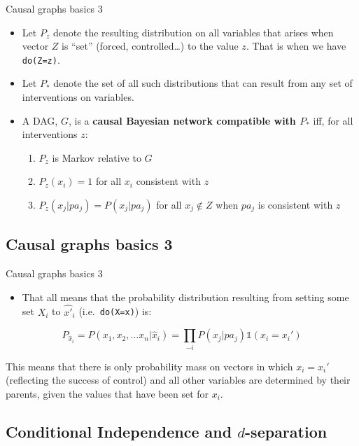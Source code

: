 \documentclass[
  11pt,
  ignorenonframetext,
]{beamer}
\providecommand{\tightlist}{%
  \setlength{\itemsep}{0pt}\setlength{\parskip}{0pt}}\usepackage{longtable,booktabs,array}
\begin{document}
\begin{frame}[fragile]{Causal graphs basics 3}
\begin{itemize}
\item
  Let \(P_{z}\) denote the resulting distribution on all variables that
  arises when vector \(Z\) is ``set'' (forced, controlled\dots) to the
  value \(z\). That is when we have \texttt{do(Z=z)}.
\item
  Let \(P_*\) denote the set of all such distributions that can result
  from any set of interventions on variables.
\item
  A DAG, \(G\), is a \textbf{causal Bayesian network compatible with
  \(P_*\)} iff, for all interventions \(z\):

  \begin{enumerate}
  \tightlist
  \item
    \(P_{z}\) is Markov relative to \(G\)
  \item
    \(P_z(x_i)=1\) for all \(x_i\) consistent with \(z\)
  \item
    \(P_z(x_j|pa_j)=P(x_j|pa_j)\) for all \(x_j \not\in Z\) when
    \(pa_j\) is consistent with \(z\)
  \end{enumerate}
\end{itemize}
\end{frame}

\hypertarget{causal-graphs-basics-3-3}{%
\subsection{Causal graphs basics 3}\label{causal-graphs-basics-3-3}}

\begin{frame}[fragile]{Causal graphs basics 3}
\begin{itemize}
\tightlist
\item
  That all means that the probability distribution resulting from
  setting some set \(X_i\) to \(\hat{x'}_i\)
  (i.e.~\texttt{do(X=x\textquotesingle{})}) is:
\end{itemize}

\[P_{\hat{x}_i}=P(x_1,x_2,\dots x_n|\hat{x}_i) = \prod_{-i}P(x_j|pa_j)\mathbb{1}(x_i = x_i')\]

This means that there is only probability mass on vectors in which
\(x_i = x_i'\) (reflecting the success of control) and all other
variables are determined by their parents, given the values that have
been set for \(x_i\).
\end{frame}

\hypertarget{conditional-independence-and-d-separation}{%
\subsection{\texorpdfstring{Conditional Independence and
\(d\)-separation}{Conditional Independence and d-separation}}\label{conditional-independence-and-d-separation}}
\end{document}
